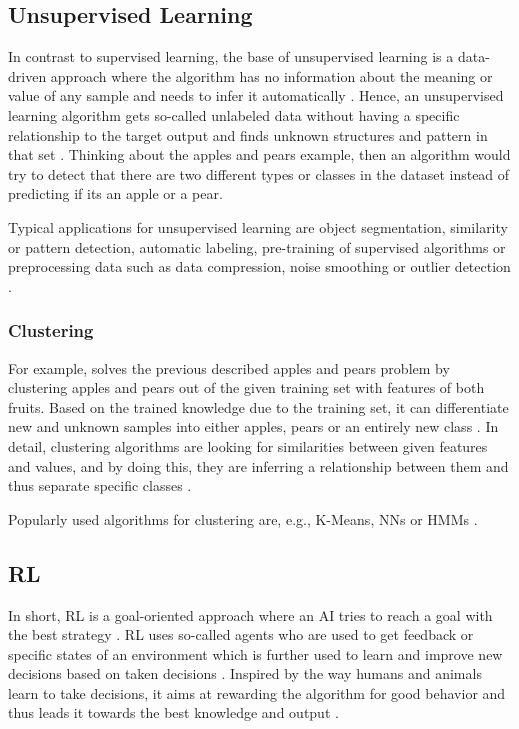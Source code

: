 \documentclass[MGS,Master,english]{twbook}%
\begin{document}
\subsection{Unsupervised Learning} \label{ML::unsupervisedLearning}
In contrast to supervised learning, the base of unsupervised learning is a data-driven approach where the algorithm has no information about the meaning or value of any sample and needs to infer it automatically \cite{ml::book::developer}. Hence, an unsupervised learning algorithm gets so-called unlabeled data without having a specific relationship to the target output and finds unknown structures and pattern in that set \cite{ai::book}. Thinking about the apples and pears example, then an algorithm would try to detect that there are two different types or classes in the dataset instead of predicting if its an apple or a pear.

Typical applications for unsupervised learning are object segmentation, similarity or pattern detection, automatic labeling, pre-training of supervised algorithms or preprocessing data such as data compression, noise smoothing or outlier detection \cite{ml::book::algorithms} \cite{ai::book}.

\subsubsection{Clustering}
For example, solves the previous described apples and pears problem by clustering apples and pears out of the given training set with features of both fruits. Based on the trained knowledge due to the training set, it can differentiate new and unknown samples into either apples, pears or an entirely new class \cite{ai::book}. In detail, clustering algorithms are looking for similarities between given features and values, and by doing this, they are inferring a relationship between them and thus separate specific classes \cite{ml::book::developer}.

Popularly used algorithms for clustering are, e.g., K-Means, \acp{NN} or \acp{HMM}  \cite{ml::book::developer}.

\subsection{\acl{RL}}
In short, \ac{RL} is a goal-oriented approach where an AI tries to reach a goal with the best strategy \cite{ml::book::developer}. RL uses so-called agents who are used to get feedback or specific states of an environment which is further used to learn and improve new decisions based on taken decisions \cite{ml::book::developer}. Inspired by the way humans and animals learn to take decisions, it aims at rewarding the algorithm for good behavior and thus leads it towards the best knowledge and output \cite{ai::book}. 
\end{document}
